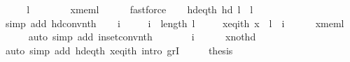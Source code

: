 \begin{isabellebody}
\endisadelimproof
%
\isatagproof
{}\isamarkupfalse%
\ {\isacharminus}{\kern0pt}\isanewline
\ \ \isamarkupfalse%
\ {\isachardoublequoteopen}l\ {\isasymnoteq}\ {\isacharbrackleft}{\kern0pt}{\isacharbrackright}{\kern0pt}{\isachardoublequoteclose}\isanewline
\ \ \ \ \isamarkupfalse%
\ x{\isacharunderscore}{\kern0pt}mem{\isacharunderscore}{\kern0pt}l\isanewline
\ \ \ \ \isamarkupfalse%
\ fastforce\isanewline
\ \ \isamarkupfalse%
\ hd{\isacharunderscore}{\kern0pt}eq{\isacharunderscore}{\kern0pt}{}th{\isacharcolon}{\kern0pt}\ {\isachardoublequoteopen}hd\ l\ {\isacharequal}{\kern0pt}\ l\ {\isacharbang}{\kern0pt}\ {}{\isachardoublequoteclose}\isanewline
\ \ \ \ \isamarkupfalse%
\ {\isacharparenleft}{\kern0pt}simp\ add{\isacharcolon}{\kern0pt}\ hd{\isacharunderscore}{\kern0pt}conv{\isacharunderscore}{\kern0pt}nth{\isacharparenright}{\kern0pt}\isanewline
\ \ \isamarkupfalse%
\ i\ \isanewline
\ \ \ \ {\isachardoublequoteopen}i\ {\isacharless}{\kern0pt}\ length\ l{\isachardoublequoteclose}\ \isanewline
\ \ \ \ x{\isacharunderscore}{\kern0pt}eq{\isacharunderscore}{\kern0pt}ith{\isacharcolon}{\kern0pt}\ {\isachardoublequoteopen}x\ {\isacharequal}{\kern0pt}\ l\ {\isacharbang}{\kern0pt}\ i{\isachardoublequoteclose}\isanewline
\ \ \ \ \isamarkupfalse%
\ x{\isacharunderscore}{\kern0pt}mem{\isacharunderscore}{\kern0pt}l\isanewline
\ \ \ \ \isamarkupfalse%
\ {\isacharparenleft}{\kern0pt}auto\ simp\ add{\isacharcolon}{\kern0pt}\ in{\isacharunderscore}{\kern0pt}set{\isacharunderscore}{\kern0pt}conv{\isacharunderscore}{\kern0pt}nth{\isacharparenright}{\kern0pt}\isanewline
\ \ \isamarkupfalse%
\ \isamarkupfalse%
\ {\isachardoublequoteopen}{}\ {\isacharless}{\kern0pt}\ i{\isachardoublequoteclose}\isanewline
\ \ \ \ \isamarkupfalse%
\ x{\isacharunderscore}{\kern0pt}not{\isacharunderscore}{\kern0pt}hd\isanewline
\ \ \ \ \isamarkupfalse%
\ {\isacharparenleft}{\kern0pt}auto\ simp\ add{\isacharcolon}{\kern0pt}\ hd{\isacharunderscore}{\kern0pt}eq{\isacharunderscore}{\kern0pt}{}th\ x{\isacharunderscore}{\kern0pt}eq{\isacharunderscore}{\kern0pt}ith\ intro{\isacharcolon}{\kern0pt}\ gr{}I{\isacharparenright}{\kern0pt}\isanewline
\ \ \isamarkupfalse%
\ \isamarkupfalse%
\ {\isacharquery}{\kern0pt}thesis\isanewline
\ \ \ \ \isamarkupfalse%

\end{isabellebody}
